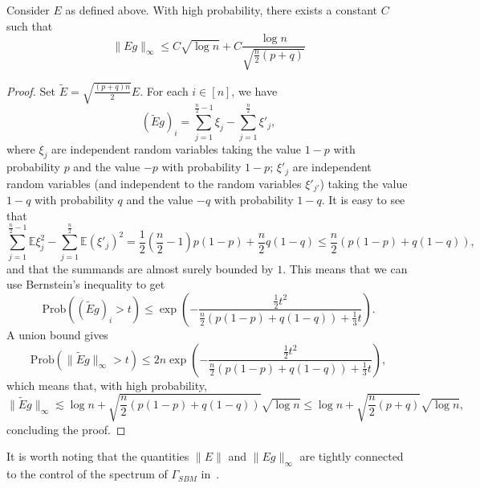 \documentclass{colt2016} %
\newcommand{\1}{\mathbf{1}}
\newcommand{\EE}{\mathbb{E}}
\begin{document}
\begin{lemma}\label{lemma:sbm:infnormE}
 Consider $E$ as defined above. With high probability, there exists a constant $C$ such that
 \[
  \|Eg\|_\infty \leq C\sqrt{\log n} + C\frac{\log n}{\sqrt{\frac{n}2(p+q)}}
 \]
\end{lemma}
\begin{proof}
Set $\tilde{E} = \sqrt{\frac{(p+q)n}{2}}E$. For each $i\in [n]$, we have
\[
 (\tilde{E}g)_i = \sum_{j=1}^{\frac{n}2-1}\xi_j - \sum_{j=1}^{\frac{n}2}\xi'_j,
\]
where $\xi_j$ are independent random variables taking the value $1-p$ with probability $p$ and the value $-p$ with probability $1-p$; $\xi'_j$ are independent random variables (and independent to the random variables $\xi'_{j'}$) taking the value $1-q$ with probability $q$ and the value $-q$ with probability $1-q$. It is easy to see that
\[
 \sum_{j=1}^{\frac{n}2-1}\EE\xi_j^2 - \sum_{j=1}^{\frac{n}2}\EE\left(\xi'_j\right)^2 = \frac12(\frac{n}2-1)p(1-p) + \frac{n}2q(1-q) \leq \frac{n}2(p(1-p)+q(1-q)) ,
\]
and that the summands are almost surely bounded by $1$. This means that we can use Bernstein's inequality to get
\[
 \mathrm{Prob}\left( (\tilde{E}g)_i > t \right) \leq \exp\left( - \frac{\frac12t^2}{\frac{n}2(p(1-p)+q(1-q)) + \frac13t} \right).
\]
A union bound gives
\[
 \mathrm{Prob}\left( \|\tilde{E}g\|_\infty > t \right) \leq 2n\exp\left( - \frac{\frac12t^2}{\frac{n}2(p(1-p)+q(1-q)) + \frac13t} \right),
\]
which means that, with high probability,
\[
 \|\tilde{E}g\|_\infty \lesssim \log n + \sqrt{\frac{n}2(p(1-p)+q(1-q))}\sqrt{\log n} \leq \log n + \sqrt{\frac{n}2(p+q)}\sqrt{\log n},
\]
concluding the proof.
\end{proof}

\begin{remark}
It is worth noting that the quantities $\|E\|$ and $\|Eg\|_\infty$ are tightly connected to the control of the spectrum of $\Gamma_{SBM}$ in~\citep[Definition 4.8]{bandeira2015laplacian}. 
\end{remark}


 
 
% 
\end{document}
